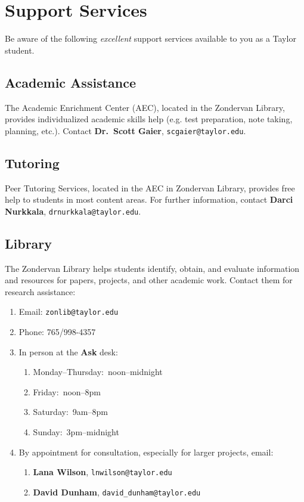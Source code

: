\section{Support Services}

Be aware of the following \emph{excellent} support services
available to you as a Taylor student.

\subsection{Academic Assistance}

The Academic Enrichment Center (AEC), located in the Zondervan Library,
provides individualized academic skills help
(e.g. test preparation, note taking, planning, etc.).
Contact \textbf{Dr.\ Scott Gaier}, \texttt{scgaier@taylor.edu}.
 
\subsection{Tutoring}

Peer Tutoring Services,
located in the AEC in Zondervan Library,
provides free help to students in most content areas.
For further information, contact
\textbf{Darci Nurkkala}, \texttt{drnurkkala@taylor.edu}.


\subsection{Library}

The Zondervan Library helps students
identify, obtain, and evaluate
information and resources
for papers, projects, and other academic work.
Contact them for research assistance:
\begin{enumerate}
\item
  Email: \texttt{zonlib@taylor.edu}
\item
  Phone: 765/998-4357
\item
  In person at the \textbf{Ask} desk:
  \begin{enumerate}
  \item Monday--Thursday:\ noon--midnight
  \item Friday:\ noon--8pm
  \item Saturday:\ 9am--8pm
  \item Sunday:\ 3pm--midnight
  \end{enumerate}
\item By appointment for consultation, especially for larger projects, email:
  \begin{enumerate}
  \item \textbf{Lana Wilson}, \texttt{lnwilson@taylor.edu}
  \item \textbf{David Dunham}, \texttt{david\_dunham@taylor.edu}
  \end{enumerate}
\end{enumerate}

